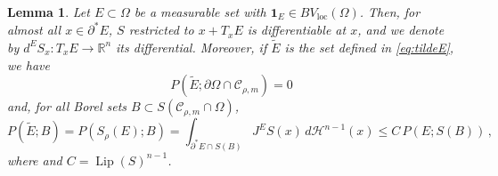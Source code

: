 \documentclass[a4paper,reqno,11pt]{amsart}
\newtheorem{lemma}[theorem]{Lemma}
\newcommand{\R}{\mathbb{R}}
\newcommand{\ra}{\rightarrow}
\newcommand{\Hau}{{\mathcal H}} %
\newcommand{\de}{\partial}
\newcommand{\loc}{\mathop{\mathrm{loc}}}
\newcommand{\ch}{\mathbf{1}}
\newcommand{\cC}{\mathcal{C}}
\newcommand{\Lip}{\mathop{\mathrm{Lip}}}
\newcommand{\p}{P}
\begin{document}
\begin{lemma} \label{lem:boundS}
Let $E \subset \Omega$ be a measurable set with $\ch_E \in BV_{\loc}(\Omega)$. Then, for almost all $x \in \de^\ast E$, $S$ restricted to $x+T_{x}E$ is differentiable at $x$, and we denote by $d^E S_x: T_x E \ra \R^{n}$ its differential. Moreover, if $\tilde E$ is the set defined in \eqref{eq:tildeE}, we have 
\begin{equation}\label{eq:pEtildezero}
\p(\tilde E;\de\Omega\cap \cC_{\rho,m}) = 0
\end{equation}
and, for all Borel sets $B \subset S(\cC_{\rho,m} \cap \Omega)$, 
\begin{equation} \label{eq:perim}
\p(\tilde E;B) = \p(S_{\rho}(E);B) = \int_{\de^\ast E \cap S(B)} J^E S (x) \, d \Hau^{n-1}(x) \le C\,\p(E;S(B)) \, ,
\end{equation}
where  and $C = \Lip(S)^{n-1}$.
\end{lemma}
\end{document}

